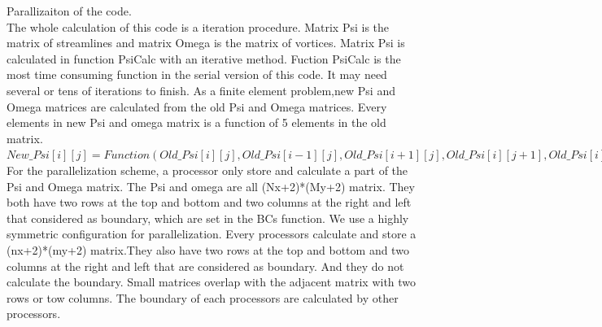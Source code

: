 \documentclass{report}
\begin{document}
 Parallizaiton of the code.\\
 The whole calculation of this code is a iteration procedure. Matrix Psi is the matrix of streamlines and matrix Omega is the matrix of vortices. Matrix Psi is calculated in function PsiCalc with an iterative method. Fuction PsiCalc is the most time consuming function in the serial version of this code. It may need several or tens of iterations to finish. As a finite element problem,new Psi  and Omega matrices are calculated from the old Psi and Omega matrices. Every elements in new Psi and omega matrix is a function of 5 elements in the old matrix.\\
   $New\_Psi[i][j]=Function( Old\_Psi[i][j],Old\_Psi[i-1][j],Old\_Psi[i+1][j],Old\_Psi[i][j+1],Old\_Psi[i][j-1] )$\\
 For the parallelization scheme, a processor only store and calculate a part of the Psi and Omega matrix. The Psi and omega are all (Nx+2)*(My+2) matrix. They both have two rows at the top and bottom and two columns at the right and left that considered as boundary, which are set in the BCs function. We use a highly symmetric configuration for parallelization. Every processors calculate and store a (nx+2)*(my+2) matrix.They also have  two rows at the top and bottom and two columns at the right and left that are considered as boundary. And they do not calculate the boundary. Small matrices  overlap with the adjacent matrix with two rows or tow columns. The boundary of each processors are calculated by other processors.
 
\end{document}
